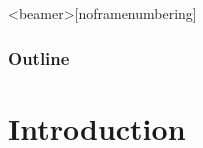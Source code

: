 \documentclass[10 pt]{beamer}
\begin{document}
%


\begin{frame}<beamer>[noframenumbering]
     \frametitle{Outline}
     \tableofcontents
\end{frame}







\setcounter{tocdepth}{4}
\section{Introduction}
\end{document}

